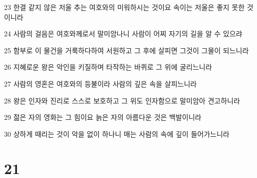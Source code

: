\par 23 한결 같지 않은 저울 추는 여호와의 미워하시는 것이요 속이는 저울은 좋지 못한 것이니라
\par 24 사람의 걸음은 여호와께로서 말미암나니 사람이 어찌 자기의 길을 알 수 있으랴
\par 25 함부로 이 물건을 거룩하다하여 서원하고 그 후에 살피면 그것이 그물이 되느니라
\par 26 지혜로운 왕은 악인을 키질하며 타작하는 바퀴로 그 위에 굴리느니라
\par 27 사람의 영혼은 여호와의 등불이라 사람의 깊은 속을 살피느니라
\par 28 왕은 인자와 진리로 스스로 보호하고 그 위도 인자함으로 말미암아 견고하니라
\par 29 젊은 자의 영화는 그 힘이요 늙은 자의 아름다운 것은 백발이니라
\par 30 상하게 때리는 것이 악을 없이 하나니 매는 사람의 속에 깊이 들어가느니라

\chapter{21}


